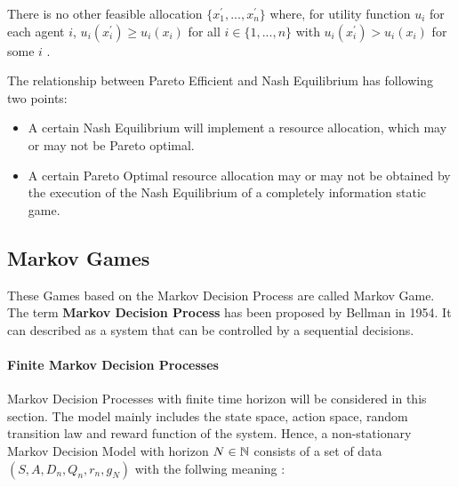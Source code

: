 \begin{proposition}
There is no other feasible allocation $\{x_{1}^{\prime},...,x_{n}^{\prime}\}$ where, for 
utility function $u_i$ for each agent $i$, $u_{i}(x_{i}^{\prime}) \geqslant u_{i}(x_{i})$ for all $i \in \{1,...,n\}$ with $u_{i}(x_{i}^{\prime})>u_{i}(x_{i})$ for some $i$ \parencite{Whinston1989}.
\end{proposition}

The relationship between Pareto Efficient and Nash Equilibrium has following two points:

\begin{itemize}
\item A certain Nash Equilibrium will implement a resource allocation, which may or may not be Pareto optimal.
\item A certain Pareto Optimal resource allocation may or may not be obtained by the execution of the Nash Equilibrium of a completely information static game.
\end{itemize}

\subsection{Markov Games}
These Games based on the Markov Decision Process are called Markov Game. The term \textbf{Markov Decision Process} has been proposed by Bellman in 1954\parencite{Bellma1954}. It can described as a system that can be controlled by a sequential decisions.

\paragraph{Finite Markov Decision Processes}
Markov Decision Processes with finite time horizon will be considered in this section. The model mainly includes the state space, action space, random transition law and reward function of the system. Hence, a non-stationary Markov Decision Model with horizon $N \in \mathbb{N}$ consists of a set of data $(S, A, D_n, Q_n, r_n, g_N)$ with the follwing meaning \parencite{Bäuerle2010}:

